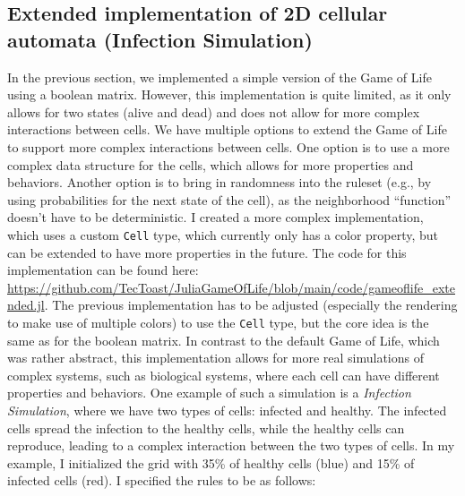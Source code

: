 \documentclass[a4paper,12pt]{llncs}
\numberwithin{equation}{section}
\begin{document}
\subsection{Extended implementation of 2D cellular automata (Infection Simulation)}
In the previous section, we implemented a simple version of the Game of Life using a boolean matrix.
However, this implementation is quite limited, as it only allows for two states (alive and dead) and does not allow for more complex interactions between cells.
We have multiple options to extend the Game of Life to support more complex interactions between cells.
One option is to use a more complex data structure for the cells, which allows for more properties and behaviors.
Another option is to bring in randomness into the ruleset (e.g., by using probabilities for the next state of the cell), as the neighborhood ``function'' doesn't have to be deterministic.
I created a more complex implementation, which uses a custom \texttt{Cell} type, which currently only has a color property, but can be extended to have more properties in the future.
The code for this implementation can be found here: \url{https://github.com/TecToast/JuliaGameOfLife/blob/main/code/gameoflife_extended.jl}.
The previous implementation has to be adjusted (especially the rendering to make use of multiple colors) to use the \texttt{Cell} type, but the core idea is the same as for the boolean matrix.
In contrast to the default Game of Life, which was rather abstract, this implementation allows for more real simulations of complex systems, such as biological systems, where each cell can have different properties and behaviors.
One example of such a simulation is a \emph{Infection Simulation}, where we have two types of cells: infected and healthy.
The infected cells spread the infection to the healthy cells, while the healthy cells can reproduce, leading to a complex interaction between the two types of cells.
In my example, I initialized the grid with 35\% of healthy cells (blue) and 15\% of infected cells (red). I specified the rules to be as follows:
\end{document}
